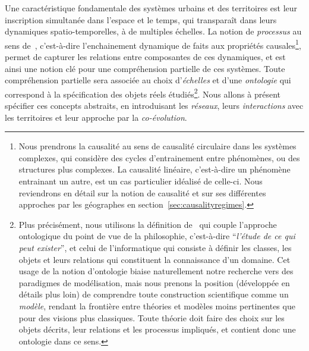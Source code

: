 {Une caractéristique fondamentale des systèmes urbains et des territoires est leur inscription simultanée dans l'espace et le temps, qui transparaît dans leurs dynamiques spatio-temporelles, à de multiples échelles. La notion de \emph{processus} au sens de~\cite{hypergeo}, c'est-à-dire l'enchainement dynamique de faits aux propriétés causales\footnote{Nous prendrons la causalité au sens de causalité circulaire dans les systèmes complexes, qui considère des cycles d'entrainement entre phénomènes, ou des structures plus complexes. La causalité linéaire, c'est-à-dire un phénomène entrainant un autre, est un cas particulier idéalisé de celle-ci. Nous reviendrons en détail sur la notion de causalité et sur ses différentes approches par les géographes en section~\ref{sec:causalityregimes}.}, permet de capturer les relations entre composantes de ces dynamiques, et est ainsi une notion clé pour une compréhension partielle de ces systèmes. Toute compréhension partielle sera associée au choix d'\emph{échelles} et d'une \emph{ontologie} qui correspond à la spécification des objets réels étudiés\footnote{Plus précisément, nous utilisons la définition de~\cite{livet2010} qui couple l'approche ontologique du point de vue de la philosophie, c'est-à-dire ``\textit{l'étude de ce qui peut exister}'', et celui de l'informatique qui consiste à définir les classes, les objets et leurs relations qui constituent la connaissance d'un domaine. Cet usage de la notion d'ontologie biaise naturellement notre recherche vers des paradigmes de modélisation, mais nous prenons la position (développée en détails plus loin) de comprendre toute construction scientifique comme un \emph{modèle}, rendant la frontière entre théories et modèles moins pertinentes que pour des visions plus classiques. Toute théorie doit faire des choix sur les objets décrits, leur relations et les processus impliqués, et contient donc une ontologie dans ce sens.}. Nous allons à présent spécifier ces concepts abstraits, en introduisant les \emph{réseaux}, leurs \emph{interactions} avec les territoires et leur approche par la \emph{co-évolution}.
}

